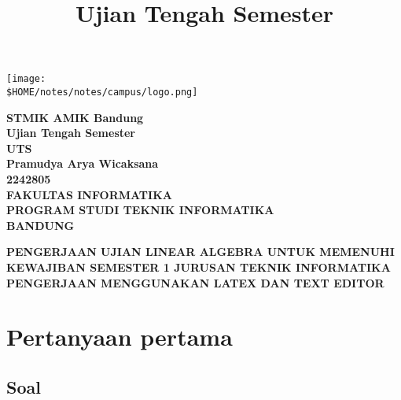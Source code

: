 \documentclass[12pt, a4paper, onecolumn, oneside, final, bahasa]{report}
\title{Ujian Tengah Semester}
\let\origfigure\figure
\let\endorigfigure\endfigure
\renewenvironment{figure}[1][2] {
    \expandafter\origfigure\expandafter[H]
} {
    \endorigfigure
}
\begin{document}
\begin{titlepage}
    \begin{center}
        \begin{figure}
            \begin{center}
                \texttt{[image: \\\$HOME/notes/notes/campus/logo.png]}
            \end{center}
        \end{figure}
        \vspace*{0cm}
        \textbf{STMIK AMIK Bandung} \\
        \textbf{Ujian Tengah Semester} \\[1.0cm]
        \vspace*{2.5cm}
        \textbf{UTS} \\
        \vspace*{3 cm}       
        \textbf{Pramudya Arya Wicaksana} \\
        \textbf{2242805} \\
        \vspace*{5.0cm}
        \textbf{
            FAKULTAS INFORMATIKA \\
            PROGRAM STUDI TEKNIK INFORMATIKA \\
            BANDUNG
        }
    \end{center}
\end{titlepage}
\setcounter{page}{2}


{
    \hypersetup{linkcolor=black}
    \tableofcontents
}

    \hypersetup{linkcolor=black}
    \listoffigures



\newpage
{}

\textbf{PENGERJAAN UJIAN LINEAR ALGEBRA UNTUK MEMENUHI KEWAJIBAN
SEMESTER 1 JURUSAN TEKNIK INFORMATIKA}\\
\textbf{PENGERJAAN MENGGUNAKAN LATEX DAN TEXT EDITOR}

\hypertarget{pertanyaan-pertama}{%
\chapter{Pertanyaan pertama}\label{pertanyaan-pertama}}

\hypertarget{soal}{%
\section{Soal}\label{soal}}
\end{document}
